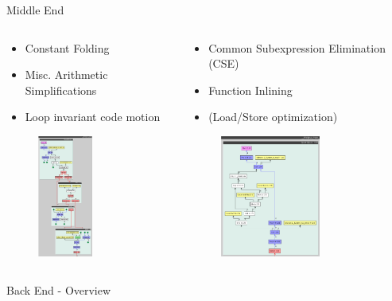 \documentclass[en,16:9]{sdqbeamer}
\begin{document}
\begin{frame}{Middle End}
	\begin{columns}
		\begin{column}{0.5\linewidth}
			\begin{itemize}
				\item Constant Folding
				\item Misc. Arithmetic Simplifications
				\item Loop invariant code motion
			\end{itemize}%
			
			\begin{figure}
				\centering
				\includegraphics[draft,width=\linewidth,height=4cm]{images/optimization-before.png}
			\end{figure}
		\end{column}
		\begin{column}{0.5\linewidth}
			\begin{itemize}
				\item Common Subexpression Elimination (CSE)
				\item Function Inlining
				\item (Load/Store optimization)
			\end{itemize}
		
			\begin{figure}
				\centering
				\includegraphics[draft,width=\linewidth,height=4cm]{images/optimization-after.png}
			\end{figure}
		\end{column}
	\end{columns}
\end{frame}

\begin{frame}{Back End - Overview}
	\begin{figure}
		\centering
		
	\end{figure}
\end{frame}
\end{document}
